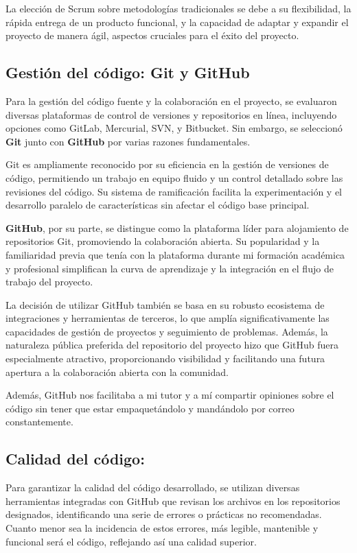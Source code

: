 La elección de Scrum sobre metodologías tradicionales se debe a su flexibilidad, la rápida entrega de un producto funcional, y la capacidad de adaptar y expandir el proyecto de manera ágil, aspectos cruciales para el éxito del proyecto.

\subsection{Gestión del código: Git y GitHub}
Para la gestión del código fuente y la colaboración en el proyecto, se evaluaron diversas plataformas de control de versiones y repositorios en línea, incluyendo opciones como GitLab, Mercurial, SVN, y Bitbucket. Sin embargo, se seleccionó \textbf{Git}\cite{Git} junto con \textbf{GitHub}\cite{Github} por varias razones fundamentales.

Git es ampliamente reconocido por su eficiencia en la gestión de versiones de código, permitiendo un trabajo en equipo fluido y un control detallado sobre las revisiones del código. Su sistema de ramificación facilita la experimentación y el desarrollo paralelo de características sin afectar el código base principal.

\textbf{GitHub}, por su parte, se distingue como la plataforma líder para alojamiento de repositorios Git, promoviendo la colaboración abierta. Su popularidad y la familiaridad previa que tenía con la plataforma durante mi formación académica y profesional simplifican la curva de aprendizaje y la integración en el flujo de trabajo del proyecto.

La decisión de utilizar GitHub también se basa en su robusto ecosistema de integraciones y herramientas de terceros, lo que amplía significativamente las capacidades de gestión de proyectos y seguimiento de problemas. Además, la naturaleza pública preferida del repositorio del proyecto hizo que GitHub fuera especialmente atractivo, proporcionando visibilidad y facilitando una futura apertura a la colaboración abierta con la comunidad.

Además, GitHub nos facilitaba a mi tutor y a mí compartir opiniones sobre el código sin tener que estar empaquetándolo y mandándolo por correo constantemente.

\subsection{Calidad del código:}
Para garantizar la calidad del código desarrollado, se utilizan diversas herramientas integradas con GitHub que revisan los archivos en los repositorios designados, identificando una serie de errores o prácticas no recomendadas. Cuanto menor sea la incidencia de estos errores, más legible, mantenible y funcional será el código, reflejando así una calidad superior.

